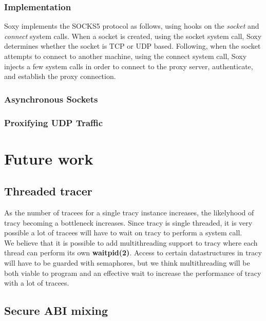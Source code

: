\documentclass[a4paper, 10pt]{report}
\begin{document}
\subsection{Implementation}

Soxy implements the SOCKS5 protocol as follows, using hooks on the
\textit{socket} and \textit{connect} system calls. When a
socket is created, using the socket system call, Soxy determines whether the
socket is TCP or UDP based. Following, when the socket attempts to connect to
another machine, using the connect system call, Soxy injects a few system
calls in order to connect to the proxy server, authenticate, and establish the
proxy connection.

\subsection{Asynchronous Sockets}

\subsection{Proxifying UDP Traffic}

\chapter{Future work}

\section{Threaded tracer}

As the number of tracees for a single tracy instance increases, the
likelyhood of tracy becoming a bottleneck increases. Since tracy is
single threaded, it is very possible a lot of tracees will have to wait
on tracy to perform a system call. \\

We believe that it is possible to add multithreading support to tracy where
each thread can perform its own \textbf{waitpid(2)}. Access to certain
datastructures in tracy will have to be guarded with semaphores, but
we think multithreading will be both viable to program and an effective
wait to increase the performance of tracy with a lot of tracees.

\section{Secure ABI mixing}
\label{secure-abi}
\end{document}
